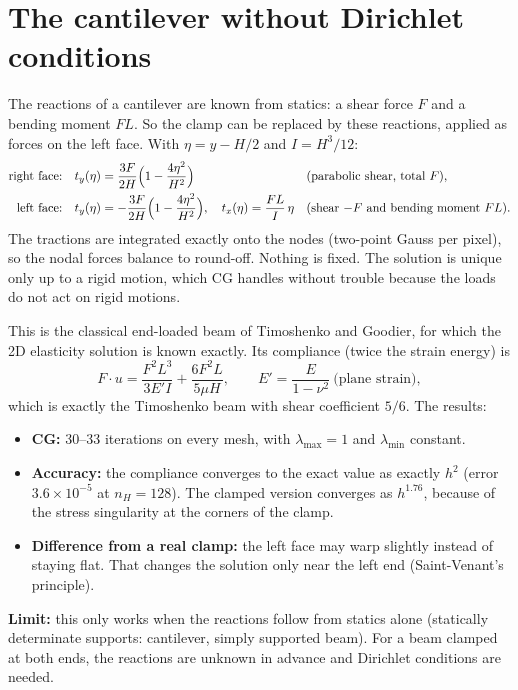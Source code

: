 \documentclass[11pt,a4paper]{article}
\begin{document}
\section{The cantilever without Dirichlet conditions}
\label{sec:traction}

The reactions of a cantilever are known from statics: a shear force $F$ and a bending moment $F L$. So the clamp can
be replaced by these reactions, applied as forces on the left face. With $\eta = y - H/2$ and $I = H^3/12$:
\begin{align*}
  \text{right face:}\quad & t_y(\eta) = \frac{3F}{2H}\Bigl(1 - \frac{4\eta^2}{H^2}\Bigr)
      && \text{(parabolic shear, total } F), \\
  \text{left face:}\quad  & t_y(\eta) = -\frac{3F}{2H}\Bigl(1 - \frac{4\eta^2}{H^2}\Bigr), \quad
                            t_x(\eta) = \frac{F L}{I}\,\eta
      && \text{(shear } {-F} \text{ and bending moment } F L).
\end{align*}
The tractions are integrated exactly onto the nodes (two-point Gauss per pixel), so the nodal forces balance to
round-off. Nothing is fixed. The solution is unique only up to a rigid motion, which CG handles without trouble because
the loads do not act on rigid motions.

This is the classical end-loaded beam of Timoshenko and Goodier, for which the 2D elasticity solution is known
exactly. Its compliance (twice the strain energy) is
\[
  F\cdot u = \frac{F^2 L^3}{3 E' I} + \frac{6 F^2 L}{5 \mu H}, \qquad E' = \frac{E}{1 - \nu^2} \ \text{(plane strain)},
\]
which is exactly the Timoshenko beam with shear coefficient $5/6$. The results:
\begin{itemize}
  \item \textbf{CG:} 30--33 iterations on every mesh, with $\lambda_{\max} = 1$ and $\lambda_{\min}$ constant.
  \item \textbf{Accuracy:} the compliance converges to the exact value as exactly $h^2$ (error $3.6\times10^{-5}$ at
        $n_H = 128$). The clamped version converges as $h^{1.76}$, because of the stress singularity at the corners of
        the clamp.
  \item \textbf{Difference from a real clamp:} the left face may warp slightly instead of staying flat. That changes the
        solution only near the left end (Saint-Venant's principle).
\end{itemize}
\textbf{Limit:} this only works when the reactions follow from statics alone (statically determinate supports:
cantilever, simply supported beam). For a beam clamped at both ends, the reactions are unknown in advance and Dirichlet
conditions are needed.
\end{document}
